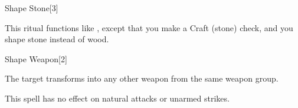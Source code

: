 \begin{spellsection}{Shape Stone}[3]
    \begin{spellheader}
    \end{spellheader}
    \begin{spellcontent}
        \begin{spelltargetinginfo}
        \end{spelltargetinginfo}
        \begin{spelleffects}

            \spellspecial This ritual functions like , except that you make a Craft (stone) check, and you shape stone instead of wood.
        \end{spelleffects}
    \end{spellcontent}
    \begin{spellfooter}
    \end{spellfooter}
\end{spellsection}

\begin{spellsection}{Shape Weapon}[2]
    \begin{spellheader}
    \end{spellheader}
    \begin{spellcontent}
        \begin{spelltargetinginfo}
        \end{spelltargetinginfo}
        \begin{spelleffects}

            \spelleffect The target transforms into any other weapon from the same weapon group.
        \end{spelleffects}
    \end{spellcontent}
    \begin{spellfooter}
        \spellnotes This spell has no effect on natural attacks or unarmed strikes.
    \end{spellfooter}
\end{spellsection}

